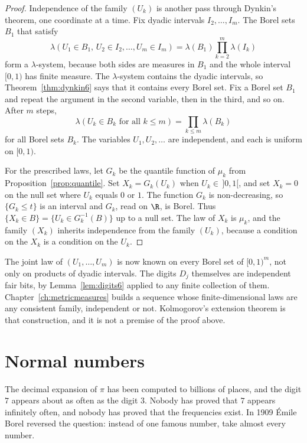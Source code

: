 \begin{proof}
Independence of the family $(U_k)$ is another pass through Dynkin's theorem, one coordinate at a time.
Fix dyadic intervals $I_2,\ldots,I_m$.
The Borel sets $B_1$ that satisfy
\[
\lambda(U_1\in B_1,\,U_2\in I_2,\ldots,U_m\in I_m)=\lambda(B_1)\prod_{k=2}^m\lambda(I_k)
\]
form a $\lambda$-system, because both sides are measures in $B_1$ and the whole interval $[0,1)$ has finite measure.
The $\lambda$-system contains the dyadic intervals, so Theorem~\ref{thm:dynkin6} says that it contains every Borel set.
Fix a Borel set $B_1$ and repeat the argument in the second variable, then in the third, and so on.
After $m$ steps,
\[
\lambda(U_k\in B_k\text{ for all }k\le m)=\prod_{k\le m}\lambda(B_k)
\]
for all Borel sets $B_k$.
The variables $U_1,U_2,\ldots$ are independent, and each is uniform on $[0,1)$.

For the prescribed laws, let $G_k$ be the quantile function of $\mu_k$ from Proposition~\ref{prop:quantile}.
Set $X_k=G_k(U_k)$ when $U_k\in\,]0,1[$, and set $X_k=0$ on the null set where $U_k$ equals $0$ or $1$.
The function $G_k$ is non-decreasing, so $\{G_k\le t\}$ is an interval and $G_k$, read on $\R$, is Borel.
Thus $\{X_k\in B\}=\{U_k\in G_k^{-1}(B)\}$ up to a null set.
The law of $X_k$ is $\mu_k$, and the family $(X_k)$ inherits independence from the family $(U_k)$, because a condition on the $X_k$ is a condition on the $U_k$.
\end{proof}

The joint law of $(U_1,\ldots,U_m)$ is now known on every Borel set of $[0,1)^m$, not only on products of dyadic intervals.
The digits $D_j$ themselves are independent fair bits, by Lemma~\ref{lem:digits6} applied to any finite collection of them.
Chapter~\ref{ch:metricmeasures} builds a sequence whose finite-dimensional laws are any consistent family, independent or not.
Kolmogorov's extension theorem is that construction, and it is not a premise of the proof above.

\section{Normal numbers}

The decimal expansion of $\pi$ has been computed to billions of places, and the digit $7$ appears about as often as the digit $3$.
Nobody has proved that $7$ appears infinitely often, and nobody has proved that the frequencies exist.
In 1909 \'Emile Borel reversed the question: instead of one famous number, take almost every number.


